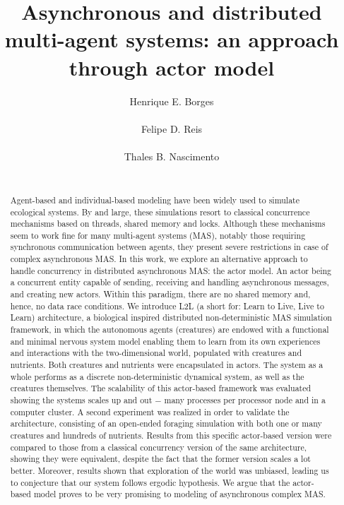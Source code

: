 \documentclass{aamas2017}
\begin{document}
\title{Asynchronous and distributed multi-agent systems: an approach through actor model}

\author{
	\alignauthor
	Henrique E. Borges\\
	\\
	\alignauthor
	Felipe D. Reis\\
	\\
	\alignauthor
	Thales B. Nascimento\\
	\\
}

\maketitle

\begin{abstract}
	Agent-based and individual-based modeling have been widely used to simulate ecological systems. By and large, these simulations resort to classical concurrence mechanisms based on threads, shared memory and locks. Although these mechanisms seem to work fine for many multi-agent systems (MAS), notably those requiring synchronous communication between agents, they present severe restrictions in case of complex asynchronous MAS. In this work, we explore an alternative approach to handle concurrency in distributed asynchronous MAS: the actor model. An actor being a concurrent entity capable of sending, receiving and handling asynchronous messages, and creating new actors. Within this paradigm, there are no shared memory and, hence, no data race conditions. We introduce L2L (a short for: Learn to Live, Live to Learn) architecture, a biological inspired distributed non-deterministic MAS simulation framework, in which the autonomous agents (creatures) are endowed with a functional and minimal nervous system model enabling them to learn from its own experiences and interactions with the two-dimensional world, populated with creatures and nutrients. Both creatures and nutrients were encapsulated in actors. The system as a whole performs as a discrete non-deterministic dynamical system, as well as the creatures themselves. The scalability of this actor-based framework was evaluated showing the systems scales up and out $-$ many processes per processor node and in a computer cluster. A second experiment was realized in order to validate the architecture, consisting of an open-ended foraging simulation with both one or many creatures and hundreds of nutrients. Results from this specific actor-based version were compared to those from a classical concurrency version of the same architecture, showing they were equivalent, despite the fact that the former version scales a lot better. Moreover, results shown that exploration of the world was unbiased, leading us to conjecture that our system follows ergodic hypothesis. We argue that the actor-based model proves to be very promising to modeling of asynchronous complex MAS. 
\end{abstract}
\end{document}
